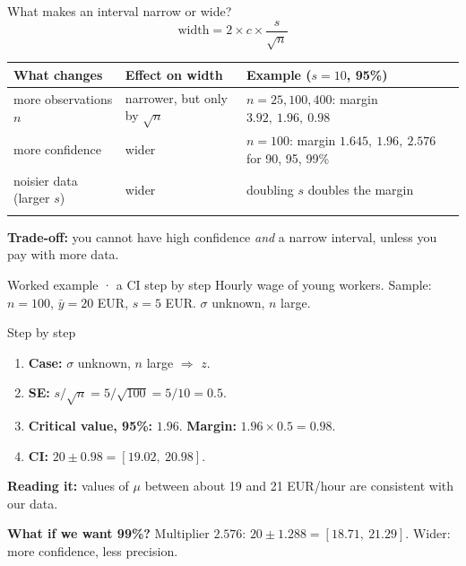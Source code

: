 \documentclass[
  11pt,
  ignorenonframetext,
  aspectratio=169,
]{beamer}
\newcounter{none} %
\providecommand{\tightlist}{%
  \setlength{\itemsep}{0pt}\setlength{\parskip}{0pt}}
\begin{document}
\begin{frame}{What makes an interval narrow or wide?}
\protect{}\label{what-makes-an-interval-narrow-or-wide}
\[\text{width}=2\times c\times\frac{s}{\sqrt n}\]

{\def\LTcaptype{none} %
\begin{longtable}[]{@{}
  >{\raggedright\arraybackslash}p{}
  >{\raggedright\arraybackslash}p{}
  >{\raggedright\arraybackslash}p{}@{}}
\toprule\noalign{}
\begin{minipage}[b]{\linewidth}\raggedright
What changes
\end{minipage} & \begin{minipage}[b]{\linewidth}\raggedright
Effect on width
\end{minipage} & \begin{minipage}[b]{\linewidth}\raggedright
Example (\(s=10\), 95\%)
\end{minipage} \\
\midrule\noalign{}
\endhead
more observations \(n\) & narrower, but only by \(\sqrt n\) &
\(n=25,100,400\): margin \(3.92,\ 1.96,\ 0.98\) \\
more confidence & wider & \(n=100\): margin \(1.645,\ 1.96,\ 2.576\) for
90, 95, 99\% \\
noisier data (larger \(s\)) & wider & doubling \(s\) doubles the
margin \\
\bottomrule\noalign{}
\end{longtable}
}

\textbf{Trade-off:} you cannot have high confidence \emph{and} a narrow interval, unless you pay with more data.
\end{frame}


\begin{frame}{Worked example · a CI step by step}
\protect{}\label{worked-example-a-ci-step-by-step}
Hourly wage of young workers. Sample: \(n=100\), \(\bar y=20\) EUR,
\(s=5\) EUR. \(\sigma\) unknown, \(n\) large.

\begin{block}{Step by step}
\protect{}\label{step-by-step}
\begin{enumerate}
\tightlist
\item
  \textbf{Case:} \(\sigma\) unknown, \(n\) large \(\Rightarrow\) \(z\).
\item
  \textbf{SE:} \(s/\sqrt{n} = 5/\sqrt{100} = 5/10 =0.5\).
\item
  \textbf{Critical value, 95\%:} \(1.96\). \textbf{Margin:}
  \(1.96\times0.5=0.98\).
\item
  \textbf{CI:} \(20\pm0.98=[19.02,\ 20.98]\).
\end{enumerate}
\end{block}

\textbf{Reading it:} values of \(\mu\) between about 19 and 21 EUR/hour
are consistent with our data.

\textbf{What if we want 99\%?} Multiplier \(2.576\):
\(20\pm1.288=[18.71,\ 21.29]\). Wider: more confidence, less precision.
\end{frame}
\end{document}

